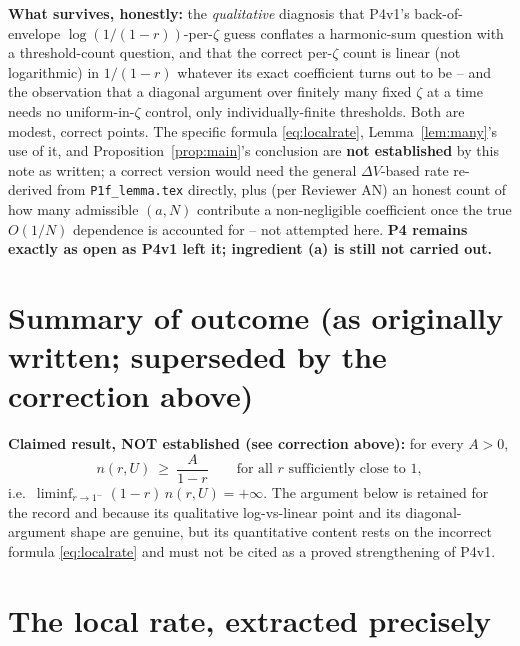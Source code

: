 \documentclass[11pt]{article}
\theoremstyle{remark}
\begin{document}
\textbf{What survives, honestly:} the \emph{qualitative} diagnosis that P4v1's back-of-envelope
$\log(1/(1-r))$-per-$\zeta$ guess conflates a harmonic-sum question with a threshold-count question,
and that the correct per-$\zeta$ count is linear (not logarithmic) in $1/(1-r)$ whatever its exact
coefficient turns out to be -- and the observation that a diagonal argument over finitely many fixed
$\zeta$ at a time needs no uniform-in-$\zeta$ control, only individually-finite thresholds. Both are
modest, correct points. The specific formula \eqref{eq:localrate}, Lemma~\ref{lem:many}'s use of it,
and Proposition~\ref{prop:main}'s conclusion are \textbf{not established} by this note as written; a
correct version would need the general $\Delta V$-based rate re-derived from \texttt{P1f\_lemma.tex}
directly, plus (per Reviewer AN) an honest count of how many admissible $(a,N)$ contribute a
non-negligible coefficient once the true $O(1/N)$ dependence is accounted for -- not attempted here.
\textbf{P4 remains exactly as open as P4v1 left it; ingredient (a) is still not carried out.}

\section*{Summary of outcome (as originally written; superseded by the correction above)}

\textbf{Claimed result, NOT established (see correction above):} for every $A>0$,
\[
   n(r,U)\ \ge\ \frac{A}{1-r}\qquad\text{for all $r$ sufficiently close to $1$},
\]
i.e.\ $\displaystyle\liminf_{r\to1^-}(1-r)\,n(r,U)=+\infty$. The argument below is retained for
the record and because its qualitative log-vs-linear point and its diagonal-argument shape are
genuine, but its quantitative content rests on the incorrect formula \eqref{eq:localrate} and must
not be cited as a proved strengthening of P4v1.

\section{The local rate, extracted precisely}\label{sec:local}
\end{document}
